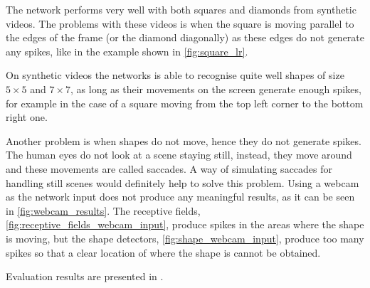 The network performs very well with both squares and diamonds from synthetic videos. The problems with these videos is when the square is moving parallel to the edges of the frame (or the diamond diagonally) as these edges do not generate any spikes, like in the example shown in \cref{fig:square_lr}. 

On synthetic videos the networks is able to recognise quite well shapes of size $5 \times 5$ and $7 \times 7$, as long as their movements on the screen generate enough spikes, for example in the case of a square moving from the top left corner to the bottom right one. 

Another problem is when shapes do not move, hence they do not generate spikes. The human eyes do not look at a scene staying still, instead, they move around and these movements are called saccades. A way of simulating saccades for handling still scenes would definitely help to solve this problem. 
Using a webcam as the network input does not produce any meaningful results, as it can be seen in \cref{fig:webcam_results}. The receptive fields, \cref{fig:receptive_fields_webcam_input}, produce spikes in the areas where the shape is moving, but the shape detectors, \cref{fig:shape_webcam_input}, produce too many spikes so that a clear location of where the shape is cannot be obtained. 

Evaluation results are presented in .

